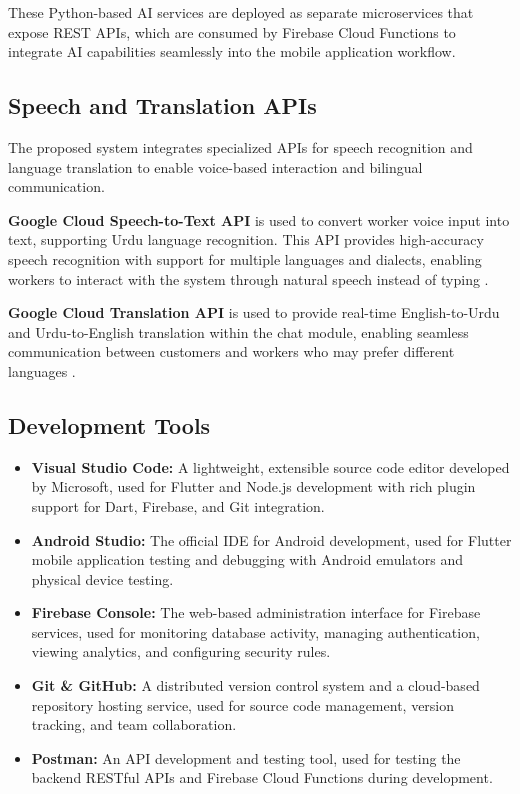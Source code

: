 \documentclass[12pt,a4paper]{report}
\begin{document}
These Python-based AI services are deployed as separate microservices that expose REST APIs, which are consumed by Firebase Cloud Functions to integrate AI capabilities seamlessly into the mobile application workflow.

\subsection{Speech and Translation APIs}
The proposed system integrates specialized APIs for speech recognition and language translation to enable voice-based interaction and bilingual communication.

\textbf{Google Cloud Speech-to-Text API} is used to convert worker voice input into text, supporting Urdu language recognition. This API provides high-accuracy speech recognition with support for multiple languages and dialects, enabling workers to interact with the system through natural speech instead of typing \cite{google_speech}.

\textbf{Google Cloud Translation API} is used to provide real-time English-to-Urdu and Urdu-to-English translation within the chat module, enabling seamless communication between customers and workers who may prefer different languages \cite{google_translation}.

\subsection{Development Tools}
\begin{itemize}
    \item \textbf{Visual Studio Code:} A lightweight, extensible source code editor developed by Microsoft, used for Flutter and Node.js development with rich plugin support for Dart, Firebase, and Git integration.
    \item \textbf{Android Studio:} The official IDE for Android development, used for Flutter mobile application testing and debugging with Android emulators and physical device testing.
    \item \textbf{Firebase Console:} The web-based administration interface for Firebase services, used for monitoring database activity, managing authentication, viewing analytics, and configuring security rules.
    \item \textbf{Git \& GitHub:} A distributed version control system and a cloud-based repository hosting service, used for source code management, version tracking, and team collaboration.
    \item \textbf{Postman:} An API development and testing tool, used for testing the backend RESTful APIs and Firebase Cloud Functions during development.
\end{itemize}
\end{document}
